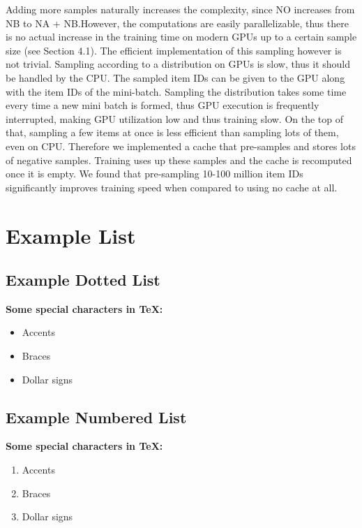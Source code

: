 Adding more samples naturally increases the complexity, since NO increases from NB to NA + NB.However, the computations are easily parallelizable, thus there is no actual increase in the training
time on modern GPUs up to a certain sample size (see Section 4.1). The efficient implementation of this sampling however is not trivial. Sampling according to a distribution on GPUs is slow, thus it should be handled by the CPU. The sampled item IDs can be given to the GPU along with the item IDs of the mini-batch. Sampling the distribution takes some time every time a new mini batch is formed, thus GPU execution is frequently interrupted, making GPU utilization low and thus training slow. On the top of that, sampling a few items at once is less efficient than sampling lots of them, even on CPU. Therefore we implemented a cache that pre-samples and stores lots of negative
samples. Training uses up these samples and the cache is recomputed once it is empty. We found that pre-sampling 10-100 million item IDs significantly improves training speed when compared to using no cache at all.



\section{Example List}
\subsection{Example Dotted List}
\smallskip
\textbf{Some special characters in TeX:}
\begin{itemize}
\item Accents
\item Braces
\item Dollar signs
\end{itemize}

\subsection{Example Numbered List}
\smallskip
\textbf{Some special characters in TeX:}
\begin{enumerate}
\item Accents
\item Braces
\item Dollar signs
\end{enumerate}

